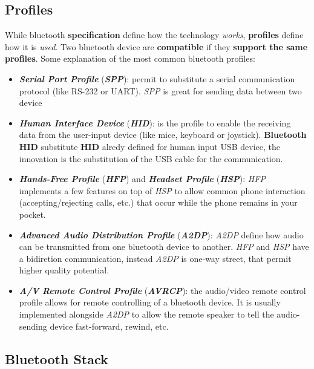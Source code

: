 \subsection{Profiles}
While bluetooth \textbf{specification} define how the technology \textit{works}, \textbf{profiles} define how it is \textit{used}. Two bluetooth device are \textbf{compatible} if they \textbf{support the same profiles}. Some explanation of the most common bluetooth profiles:
\begin{itemize}[nosep]
    
    \item \textbf{\textit{Serial Port Profile}} (\textbf{\textit{SPP}}): permit to substitute a serial communication protocol (like RS-232 or UART). \textit{SPP} is great for sending data between two device

    \item \textbf{\textit{Human Interface Device}} (\textbf{\textit{HID}}): is the profile to enable the receiving data from the user-input device (like mice, keyboard or joystick). \textbf{Bluetooth HID} substitute \textbf{HID} alredy defined for human input USB device, the innovation is the substitution of the USB cable for the communication.

    \item \textbf{\textit{Hands-Free Profile}} (\textbf{\textit{HFP}}) and \textbf{\textit{Headset Profile}} (\textbf{\textit{HSP}}): \textit{HFP} implements a few features on top of \textit{HSP} to allow common phone interaction (accepting/rejecting calls, etc.) that occur while the phone remains in your pocket.

    \item \textbf{\textit{Advanced Audio Distribution Profile}} (\textbf{\textit{A2DP}}): \textit{A2DP} define how audio can be transmitted from one bluetooth device to another. \textit{HFP} and \textit{HSP} have a bidiretion communication, instead \textit{A2DP} is one-way street, that permit higher quality potential.

    \item \textbf{\textit{A/V Remote Control Profile}} (\textbf{\textit{AVRCP}}): the audio/video remote control profile allows for remote controlling of a bluetooth device. It is usually implemented alongside \textit{A2DP} to allow the remote speaker to tell the audio-sending device fast-forward, rewind, etc.

\end{itemize}

\subsection{Bluetooth Stack}


